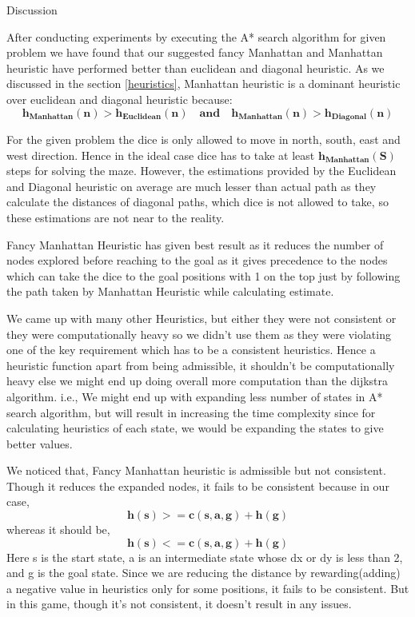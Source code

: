 \documentclass[12pt]{article}
\begin{document}
\begin{section}{Discussion}
 
  After conducting experiments by executing the A* search algorithm for given problem we have found that our suggested fancy Manhattan and Manhattan heuristic have performed better than euclidean and diagonal heuristic. As we discussed in the section \ref{heuristics}, Manhattan heuristic is a dominant heuristic over euclidean and diagonal heuristic because: 
 \[
 {\mathbf{h_{Manhattan}(n)>h_{Euclidean}(n) \quad \textrm{and} \quad h_{Manhattan}(n)>h_{Diagonal}(n) }}
\]
 \par For the given problem the dice is only allowed to move in north, south, east and west direction. Hence in the ideal case dice has to take at least $\mathbf{h_{Manhattan}(S)}$ steps for solving the maze. However, the estimations provided by the Euclidean and Diagonal heuristic on  average are much lesser than actual path as they calculate the distances of diagonal paths, which dice is not allowed to take, so these estimations are not near to the reality. 
 \par Fancy Manhattan Heuristic has given best result as it reduces the number of nodes explored before reaching to the goal as it gives precedence to the nodes which can take the dice to the goal positions with 1 on the top just by following the path taken by Manhattan Heuristic while calculating estimate.  
\par We came up with many other Heuristics, but either they were not consistent or they were computationally heavy so we didn't use them as they were violating one of the key requirement which has to be a consistent heuristics. Hence a heuristic function apart from being admissible, it shouldn’t be computationally heavy else we might end up doing overall more computation than the dijkstra algorithm. i.e., We might end up with expanding less number of states in A* search algorithm, but will result in increasing the time complexity since for calculating heuristics of each state, we would be expanding the states to give better values.

We noticed that, Fancy Manhattan heuristic is admissible but not consistent. Though it reduces the expanded nodes, it fails to be consistent because in our case, \[\mathbf{h(s) >= c(s,a,g) + h(g)}\]
whereas it should be,
 \[\mathbf{h(s) <= c(s,a,g) + h(g)}\]
Here s is the start state, a is an intermediate state whose dx or dy is less than 2, and g is the goal state.
Since we are reducing the distance by rewarding(adding) a negative value in heuristics only for some positions, it fails to be consistent. But in this game, though it's not consistent, it doesn't result in any issues.
\end{section} 
 




% 
%

 
\end{document}
